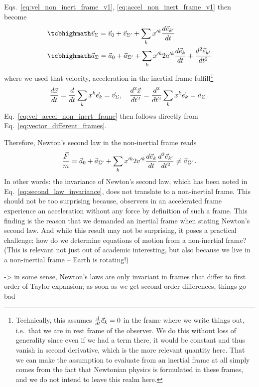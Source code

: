 \documentclass[../class_mech_main.tex]{subfiles}
\begin{document}
Eqs.~\eqref{eq:vel_non_inert_frame_v1}, \eqref{eq:accel_non_inert_frame_v1} then become
\begin{align}\label{eq:vel_accel_non_inert_frame}
	&\eqbox{
		\vec{v}_\Sigma = \vec{v}_0 + \vec{v}_{\Sigma'} + \sum_k x'^k \dv{\unitvec{k'}}{t}
	}
	\\
	&\eqbox{
		\vec{a}_\Sigma = \vec{a}_0 + \vec{a}_{\Sigma'} + \sum_k x'^k 2 a'^k \dv{\unitvec{k}}{t} + \dv[2]{\unitvec{k'}}{t}
	}
\end{align}
where we used that velocity, acceleration in the inertial frame fulfill\footnote{Technically, this assumes $\dv{t} \vec{e}_k = 0$ in the frame where we write things out, i.e.~that we are in rest frame of the observer. We do this without loss of generality since even if we had a term there, it would be constant and thus vanish in second derivative, which is the more relevant quantity here. That we can make the assumption to evaluate from an inertial frame at all simply comes from the fact that Newtonian physics is formulated in these frames, and we do not intend to leave this realm here.}
\begin{equation}
	\dv{\vec{x}}{t} = \dv{t} \sum_k x^k \vec{e}_{k} = \vec{v}_\Sigma, \quad \dv[2]{\vec{x}}{t} = \dv[2]{t} \sum_k x^k \vec{e}_{k} = \vec{a}_\Sigma
	\, .
\end{equation}
Eq.~\eqref{eq:vel_accel_non_inert_frame} then follows directly from Eq.~\eqref{eq:vector_different_frames}.


Therefore, Newton's second law in the non-inertial frame reads
\begin{equation}\label{eq:second_law_non_inert_frame}
	\frac{\vec{F}}{m} = \vec{a}_0 + \vec{a}_{\Sigma'} + \sum_k x'^k 2 v'^k \dv{\vec{e}_{k}}{t} \dv[2]{\vec{e}_{k'}}{t} \neq \vec{a}_{\Sigma'}
	\, .
\end{equation}
In other words: the invariance of Newton's second law, which has been noted in Eq.~\eqref{eq:second_law_invariance}, does not translate to a non-inertial frame. This should not be too surprising because, observers in an accelerated frame experience an acceleration without any force by definition of such a frame. This finding is the reason that we demanded an inertial frame when stating Newton's second law. And while this result may not be surprising, it poses a practical challenge: how do we determine equations of motion from a non-inertial frame? (This is relevant not just out of academic interesting, but also because we live in a non-inertial frame -- Earth is rotating!)


-> in some sense, Newton's laws are only invariant in frames that differ to first order of Taylor expansion; as soon as we get second-order differences, things go bad
\end{document}
